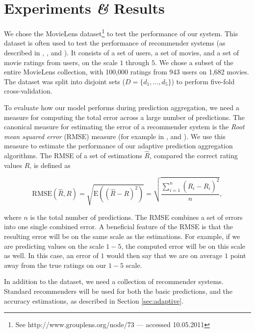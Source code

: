 \section{Experiments \emph{\&} Results}
\label{sec:results}

We chose the MovieLens dataset\footnote{
See http://www.grouplens.org/node/73 --- accessed 10.05.2011}
to test the performance of our system.
This dataset is often used to test the performance of recommender systems
(as described in 
\cite[p9]{Alshamri2008}, \cite[p4]{Lemire2005}, \cite[p1]{Adomavicius2005} and \cite[p2]{Herlocker2004}).
It consists of a set of users, a set of movies, and a set of movie ratings from users,
on the scale $1$ through $5$.
We chose a subset of the entire MovieLens collection, with 100,000 ratings from 943 users on 1,682 movies.
The dataset was split into disjoint sets
($D = \{ d_1, ..., d_5 \}$) to perform five-fold cross-validation.

To evaluate how our model performs during prediction aggregation, 
we need a measure for computing the total error across a large number of predictions.
The canonical measure for estimating the error of a recommender system
is the \emph{Root mean squared error} (RMSE) measure
(for example in \cite[p17]{Herlocker2004}, \cite[p13]{Adomavicius2005} and \cite[p6]{Bell2007}).
We use this measure to estimate the performance
of our adaptive prediction aggregation algorithms.
The RMSE of a set of estimations $\hat{R}$, 
compared the correct rating values $R$, is defined as

\begin{equation*}
  \mathrm{RMSE}(\hat{R},R) = \sqrt{\mathrm{E}((\hat{R} - R)^2)}
  = \sqrt{\frac{
      \sum_{i=1}^{n} (\hat{R}_i - R_i)^2
    }{
      n
    }},
\end{equation*}

where $n$ is the total number of predictions.
The RMSE combines a set of errors into one single combined error.
A beneficial feature of the RMSE is that the resulting error 
will be on the same scale as the estimations. For example,
if we are predicting values on the scale $1-5$, the computed error
will be on this scale as well. In this case, an error of $1$
would then say that we are on average $1$ point away from the true 
ratings on our $1-5$ scale.

In addition to the dataset, we need a collection of recommender systems.
Standard recommenders will be used for both the basic predictions,
and the accuracy estimations,
as described in Section \ref{sec:adaptive}.

